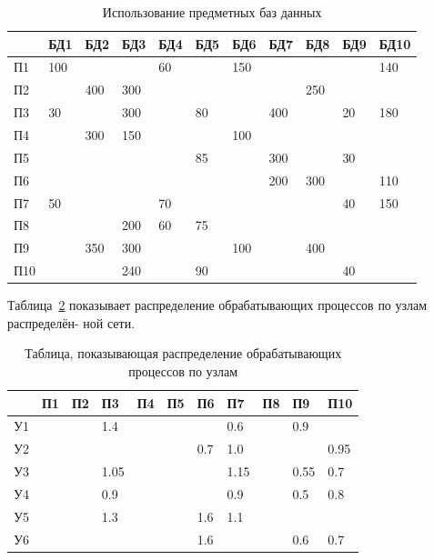 \documentclass[russian,utf8,emptystyle]{eskdtext}
\begin{document}
\begin{longtable}{p{1cm}|p{1cm}|p{1cm}|p{1cm}|p{1cm}|p{1cm}|p{1cm}|p{1cm}|p{1cm}|p{1cm}|p{1cm}}
\caption{Использование предметных баз данных}
\label{tab:bd-1} \\
       & БД1 & БД2 & БД3 & БД4 & БД5 & БД6 & БД7 & БД8 & БД9 & БД10 \\
\hline
П1     & 100 &     &     & 60  &     & 150 &     &     &     & 140 \\
\hline
П2     &     & 400 & 300 &     &     &     &     & 250 &     &     \\
\hline
П3     & 30  &     & 300 &     & 80  &     & 400 &     & 20  & 180 \\
\hline
П4     &     & 300 & 150 &     &     & 100 &     &     &     &     \\
\hline
П5     &     &     &     &     & 85  &     & 300 &     & 30  &     \\
\hline
П6     &     &     &     &     &     &     & 200 & 300 &     & 110 \\
\hline
П7     & 50  &     &     & 70  &     &     &     &     & 40  & 150 \\
\hline
П8     &     &     & 200 & 60  & 75  &     &     &     &     &     \\
\hline
П9     &     & 350 & 300 &     &     & 100 &     & 400 &     &     \\
\hline
П10    &     &     & 240 &     & 90  &     &     &     & 40  &     \\
\end{longtable}

Таблица~\ref{tab:bd-2} показывает распределение обрабатывающих процессов по узлам распределён-
ной сети.

\begin{longtable}{p{1cm}|p{1cm}|p{1cm}|p{1cm}|p{1cm}|p{1cm}|p{1cm}|p{1cm}|p{1cm}|p{1cm}|p{1cm}}
\caption{Таблица, показывающая распределение обрабатывающих процессов по узлам}
\label{tab:bd-2} \\
       &  П1 &  П2 &  П3 &  П4 &  П5 &  П6 &  П7 &  П8 &  П9 &  П10 \\
\hline
У1     &     &     & 1.4 &     &     &     & 0.6 &     & 0.9 &     \\
\hline
У2     &     &     &     &     &     & 0.7 & 1.0 &     &     & 0.95\\
\hline
У3     &     &     & 1.05&     &     &     &1.15 &     & 0.55& 0.7 \\
\hline
У4     &     &     & 0.9 &     &     &     & 0.9 &     & 0.5 & 0.8 \\
\hline
У5     &     &     & 1.3 &     &     & 1.6 & 1.1 &     &     &     \\
\hline
У6     &     &     &     &     &     & 1.6 &     &     & 0.6 & 0.7 \\
\end{longtable}
\end{document}
